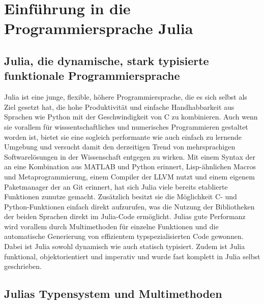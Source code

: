 \documentclass[proseminar,german,utf8]{zihpub}
\begin{document}
\section{Einführung in die Programmiersprache Julia}

\subsection{Julia, die dynamische, stark typisierte funktionale Programmiersprache}

Julia ist eine junge, flexible, höhere Programmiersprache, die es sich selbst als Ziel gesetzt hat, die hohe Produktivität und einfache Handhabbarkeit aus Sprachen wie Python mit der Geschwindigkeit von C zu kombinieren. Auch wenn sie vorallem für wisssentschaftliches und numerisches Programmieren gestaltet worden ist, bietet sie eine sogleich performante wie auch einfach zu lernende Umgebung und versucht damit den derzeitigen Trend von mehrsprachigen Softwarelösungen in der Wissenschaft entgegen zu wirken. Mit einem Syntax der an eine Kombination aus MATLAB und Python erinnert, Lisp-ähnlichen Macros und Metaprogrammierung, einem Compiler der LLVM nutzt und einem eigenem Paketmanager der an Git erinnert, hat sich Julia viele bereits etablierte Funktionen zunutze gemacht. Zusätzlich besitzt sie die Möglichkeit C- und Python-Funktionen einfach direkt aufzurufen, was die Nutzung der Bibliotheken der beiden Sprachen direkt im Julia-Code ermöglicht. Julias gute Performanz wird vorallem durch Multimethoden für einzelne Funktionen und die automatische Generierung von effizientem typspezialisierten Code gewonnen. Dabei ist Julia sowohl dynamisch wie auch statisch typisiert. Zudem ist Julia funktional, objektorientiert und imperativ und wurde fast komplett in Julia selbst geschrieben.

\subsection{Julias Typensystem und Multimethoden}
\end{document}
